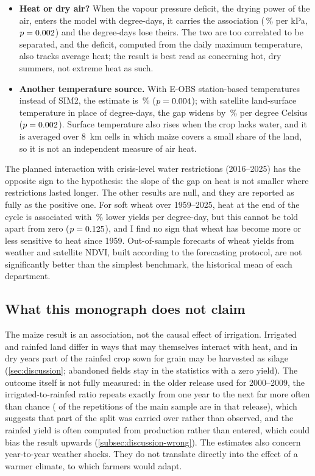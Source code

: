 \begin{itemize}
  \item \textbf{Heat or dry air?} When the vapour pressure deficit, the drying power of the air, enters the model with degree-days, it carries the association (\VpdJointPct\,\% per kPa, $p = 0.002$) and the degree-days lose theirs. The two are too correlated to be separated, and the deficit, computed from the daily maximum temperature, also tracks average heat; the result is best read as concerning hot, dry summers, not extreme heat as such.
  \item \textbf{Another temperature source.} With E-OBS station-based temperatures instead of SIM2, the estimate is \EobsPct\,\% ($p = 0.004$); with satellite land-surface temperature in place of degree-days, the gap widens by \LstPct\,\% per degree Celsius ($p = 0.002$). Surface temperature also rises when the crop lacks water, and it is averaged over 8~km cells in which maize covers a small share of the land, so it is not an independent measure of air heat.
\end{itemize}

The planned interaction with crisis-level water restrictions (2016--2025) has the opposite sign to the hypothesis: the slope of the gap on heat is not smaller where restrictions lasted longer. The other results are null, and they are reported as fully as the positive one. For soft wheat over 1959--2025, heat at the end of the cycle is associated with \QtwoPct\,\% lower yields per degree-day, but this cannot be told apart from zero ($p = 0.125$), and I find no sign that wheat has become more or less sensitive to heat since 1959. Out-of-sample forecasts of wheat yields from weather and satellite NDVI, built according to the forecasting protocol, are not significantly better than the simplest benchmark, the historical mean of each department.

\subsection*{What this monograph does not claim}

The maize result is an association, not the causal effect of irrigation. Irrigated and rainfed land differ in ways that may themselves interact with heat, and in dry years part of the rainfed crop sown for grain may be harvested as silage (\cref{sec:discussion}; abandoned fields stay in the statistics with a zero yield). The outcome itself is not fully measured: in the older release used for 2000--2009, the irrigated-to-rainfed ratio repeats exactly from one year to the next far more often than chance (\SaaRepOld{} of the \SaaRepTot{} repetitions of the main sample are in that release), which suggests that part of the split was carried over rather than observed, and the rainfed yield is often computed from production rather than entered, which could bias the result upwards (\cref{subsec:discussion-wrong}). The estimates also concern year-to-year weather shocks. They do not translate directly into the effect of a warmer climate, to which farmers would adapt.


